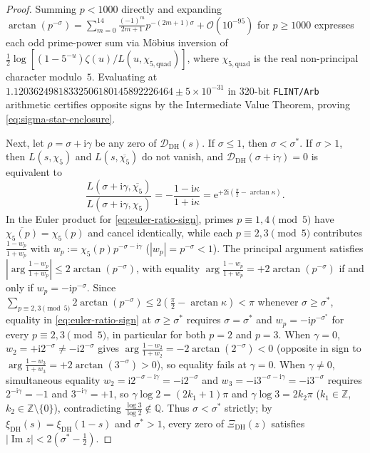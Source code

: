 \documentclass[11pt,a4paper,reqno]{amsart}
\theoremstyle{definition}
\theoremstyle{remark}
\numberwithin{equation}{section}
\newcommand{\Z}{\mathbb{Z}}
\newcommand{\Q}{\mathbb{Q}}
\newcommand{\ii}{\mathrm{i}}
\newcommand{\ee}{\mathrm{e}}
\DeclareMathOperator{\Imop}{Im}
\begin{document}
\begin{proof}
Summing $p < 1000$ directly and expanding $\arctan(p^{-\sigma}) = \sum_{m=0}^{14}\frac{(-1)^m}{2m+1}p^{-(2m+1)\sigma} + \mathcal{O}(10^{-95})$ for $p \ge 1000$ expresses each odd prime-power sum via M\"obius inversion of $\frac{1}{2}\log[(1 - 5^{-u})\zeta(u)/L(u,\chi_{5,\mathrm{quad}})]$, where $\chi_{5,\mathrm{quad}}$ is the real non-principal character modulo~$5$. Evaluating at $1.12036249818332506180145892226464 \pm 5 \times 10^{-31}$ in 320-bit \texttt{FLINT/Arb} arithmetic certifies opposite signs by the Intermediate Value Theorem, proving \eqref{eq:sigma-star-enclosure}.

Next, let $\rho = \sigma + \ii\gamma$ be any zero of $\mathcal{D}_{\mathrm{DH}}(s)$. If $\sigma \le 1$, then $\sigma < \sigma^*$. If $\sigma > 1$, then $L(s,\chi_5)$ and $L(s,\overline{\chi_5})$ do not vanish, and $\mathcal{D}_{\mathrm{DH}}(\sigma + \ii\gamma) = 0$ is equivalent to
\begin{equation}
  \frac{L(\sigma + \ii\gamma, \overline{\chi_5})}{L(\sigma + \ii\gamma, \chi_5)}
  = -\frac{1 - \ii\kappa}{1 + \ii\kappa}
  = \ee^{+2\ii(\frac{\pi}{2} - \arctan\kappa)}.
  \label{eq:euler-ratio-sign}
\end{equation}
In the Euler product for \eqref{eq:euler-ratio-sign}, primes $p \equiv 1,4 \pmod{5}$ have $\overline{\chi_5(p)} = \chi_5(p)$ and cancel identically, while each $p \equiv 2,3 \pmod{5}$ contributes $\frac{1 - w_p}{1 + w_p}$ with $w_p := \chi_5(p)p^{-\sigma - \ii\gamma}$ ($|w_p| = p^{-\sigma} < 1$). The principal argument satisfies $|\arg\frac{1 - w_p}{1 + w_p}| \le 2\arctan(p^{-\sigma})$, with equality $\arg\frac{1 - w_p}{1 + w_p} = +2\arctan(p^{-\sigma})$ if and only if $w_p = -\ii p^{-\sigma}$. Since $\sum_{p \equiv 2,3 \pmod{5}} 2\arctan(p^{-\sigma}) \le 2(\frac{\pi}{2} - \arctan\kappa) < \pi$ whenever $\sigma \ge \sigma^*$, equality in \eqref{eq:euler-ratio-sign} at $\sigma \ge \sigma^*$ requires $\sigma = \sigma^*$ and $w_p = -\ii p^{-\sigma^*}$ for every $p \equiv 2,3 \pmod{5}$, in particular for both $p = 2$ and $p = 3$. When $\gamma = 0$, $w_2 = +\ii 2^{-\sigma} \ne -\ii 2^{-\sigma}$ gives $\arg\frac{1 - w_2}{1 + w_2} = -2\arctan(2^{-\sigma}) < 0$ (opposite in sign to $\arg\frac{1 - w_3}{1 + w_3} = +2\arctan(3^{-\sigma}) > 0$), so equality fails at $\gamma = 0$. When $\gamma \ne 0$, simultaneous equality $w_2 = \ii 2^{-\sigma - \ii\gamma} = -\ii 2^{-\sigma}$ and $w_3 = -\ii 3^{-\sigma - \ii\gamma} = -\ii 3^{-\sigma}$ requires $2^{-\ii\gamma} = -1$ and $3^{-\ii\gamma} = +1$, so $\gamma\log 2 = (2k_1 + 1)\pi$ and $\gamma\log 3 = 2k_2\pi$ ($k_1 \in \Z$, $k_2 \in \Z \setminus \{0\}$), contradicting $\frac{\log 3}{\log 2} \notin \Q$. Thus $\sigma < \sigma^*$ strictly; by $\xi_{\mathrm{DH}}(s) = \xi_{\mathrm{DH}}(1-s)$ and $\sigma^* > 1$, every zero of $\Xi_{\mathrm{DH}}(z)$ satisfies $|\Imop z| < 2(\sigma^* - \frac{1}{2})$.


\end{proof}
\end{document}
